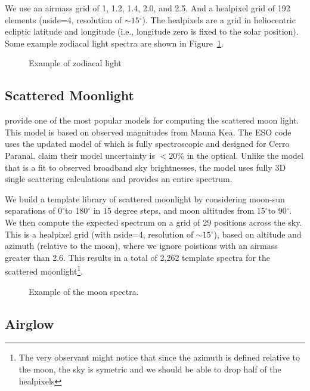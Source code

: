 \documentclass{emulateapj}  %
\newcommand\degree{{^\circ}}
\begin{document}
{We use an airmass grid of 1, 1.2, 1.4, 2.0, and 2.5. And a healpixel grid of 192 elements (nside=4, resolution of $\sim15\degree$).  The healpixels are a grid in heliocentric ecliptic latitude and longitude (i.e., longitude zero is fixed to the solar position).  Some example zodiacal light spectra are shown in Figure~\ref{fig:zodiacal}.

\begin{figure}
  \caption{Example of zodiacal light \label{fig:zodiacal}}
\end{figure}


\subsection{Scattered Moonlight}

\citet{Krisciunas91} provide one of the most popular models for computing the scattered moon light. This model is based on observed magnitudes from Mauna Kea. The ESO code uses the updated model of \citet{Jones13} which is fully spectroscopic and designed for Cerro Paranal. \citet{Jones13} claim their model uncertainty is $<20$\% in the optical.  Unlike the \citet{Krisciunas91} model that is a fit to observed broadband sky brightnesses, the \citet{Jones13} model uses fully 3D single scattering calculations and provides an entire spectrum.

We build a template library of scattered moonlight by considering moon-sun separations of 0$\degree$to 180$\degree$ in 15 degree steps, and moon altitudes from 15$\degree$to 90$\degree$.  We then compute the expected spectrum on a grid of 29 positions across the sky. This is a healpixel grid (with nside=4, resolution of $\sim15\degree$), based on altitude and azimuth (relative to the moon), where we ignore poistions with an airmass greater than 2.6. This results in a total of 2,262 template spectra for the scattered moonlight\footnote{The very observant might notice that since the azimuth is defined relative to the moon, the sky is symetric and we should be able to drop half of the healpixels}.

\begin{figure}
  \caption{Example of the moon spectra. \label{fig:moon}}
\end{figure}


\subsection{Airglow}

}
\end{document}
